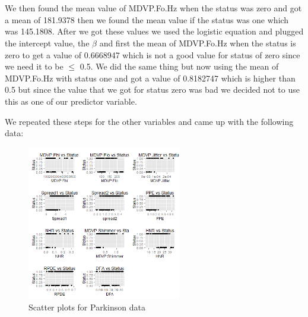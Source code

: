 \documentclass{article}
\begin{document}
We then found the mean value of MDVP.Fo.Hz when the status was zero and got a mean of
181.9378 then we found the mean value if the status was one which was 145.1808. After
we got these values we used the logistic equation and plugged the intercept value, the
$\hat{\beta}$ and first the mean of MDVP.Fo.Hz when the status is zero to get a value of
0.6668947 which is not a good value for status of zero since we need it to be $\leq$ 0.5.
We did the same thing but now using the mean of MDVP.Fo.Hz with status one and got
a value of 0.8182747 which is higher than 0.5 but since the value that we got for
status zero was bad we decided not to use this as one of our predictor variable.

We repeated these steps for the other variables and came up with the following data:

\begin{figure}
  \centering
  \includegraphics[width=0.6\textwidth]{figures/parkinson.png}
  \caption{Scatter plots for Parkinson data}
\end{figure}
\end{document}
